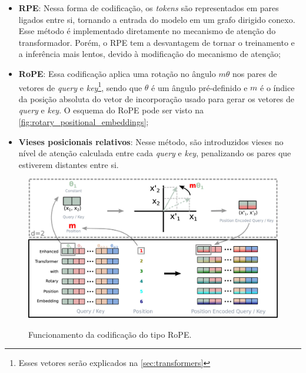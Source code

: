 \begin{itemize}
      \item \textbf{\ac{RPE}}: Nessa forma de codificação, os \textit{tokens} são representados em pares ligados entre si, tornando a entrada do modelo em um grafo
            dirigido conexo. Esse método é implementado diretamente no mecanismo de atenção do transformador. Porém, o \ac{RPE} tem a desvantagem de tornar o treinamento
            e a inferência mais lentos, devido à modificação do mecanismo de atenção;
      \item \textbf{\ac{RoPE}}: Essa codificação aplica uma rotação no ângulo \begin{math}m\theta\end{math} nos pares de vetores de
            \textit{query} e \textit{key}\footnote{Esses vetores serão explicados na \autoref{sec:transformers}}, sendo que \begin{math}\theta\end{math} é um ângulo
            pré-definido e \begin{math}m\end{math} é o índice da posição absoluta do vetor de incorporação usado para gerar os vetores de \textit{query} e \textit{key}. O
            esquema do \ac{RoPE} pode ser visto na \autoref{fig:rotary_positional_embeddings};
      \item \textbf{Vieses posicionais relativos}: Nesse método, são introduzidos vieses no nível de atenção calculada entre cada \textit{query} e \textit{key},
            penalizando os pares que estiverem distantes entre si.
\end{itemize}

\begin{figure}[ht]
      \centering
      \caption{\small Funcionamento da codificação do tipo \ac{RoPE}.}
      \includegraphics[width=0.8\columnwidth,keepaspectratio]{images/rotary_positional_embeddings.jpg}
      \label{fig:rotary_positional_embeddings}
\end{figure}

